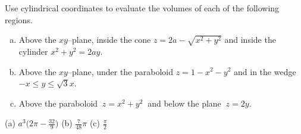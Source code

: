 \begin{question}
Use cylindrical coordinates to evaluate the volumes of each of the following
regions.
\begin{enumerate}[(a)]
\item
Above the $xy$--plane, inside the cone $z=2a-\sqrt{x^2+y^2}$ and
inside the cylinder $x^2+y^2=2ay$.
\item
Above the $xy$--plane, under the paraboloid $z=1-x^2-y^2$ and
in the wedge $-x\le y\le \sqrt{3}x$.
\item
Above the paraboloid $\ z=x^2+y^2\ $ and below the plane $\ z=2y$.
\end{enumerate}
\end{question}

%

\begin{answer}
(a) $a^3\big(2\pi-\frac{32}{9}\big)$ \qquad
(b) $\frac{7}{48}\pi$\qquad
(c) $\frac{\pi}{2}$
\end{answer}

